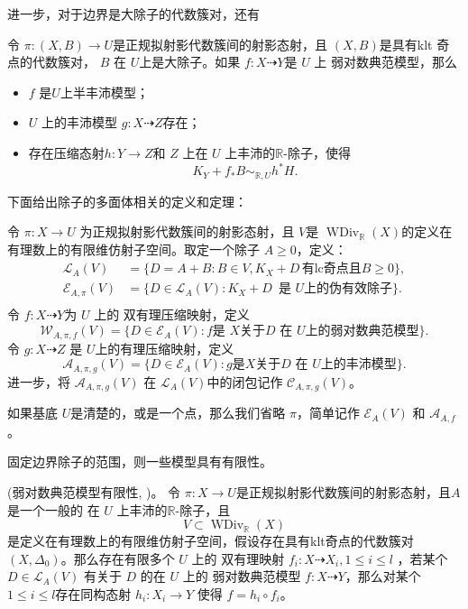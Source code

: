 进一步，对于边界是大除子的代数簇对，还有
\begin{lemma}\cite[Lemma 3.9.3]{BCHM10} 令 $ \pi:(X,B)\to U $是正规拟射影代数簇间的射影态射，且 $(X, B)$是具有klt 奇点的代数簇对，  $B$ 在 $U$上是大除子。如果 $f:X\dashrightarrow Y$是 $U$ 上 弱对数典范模型，那么
  \begin{itemize}
    \item $f$ 是$U$上半丰沛模型；
    \item  $U$ 上的丰沛模型  $g:X \dashrightarrow Z$存在；
    \item  存在压缩态射$h:Y\to Z$和 $Z$ 上在 $U$ 上丰沛的$\mathbb{R}$-除子，使得 
      \[ K_{Y}+f_*B\sim_{\mathbb{R},U} h^*H .\]
  \end{itemize}
\end{lemma}
下面给出除子的多面体相关的定义和定理：
\begin{definition}\label{polytopeofdivisor}
  \cite[Definition 1.1.4]{BCHM10} 令 $ \pi: X\to U $ 为正规拟射影代数簇间的射影态射，且 $ V $是 $ \operatorname{WDiv}_{\mathbb{R}}(X) $的定义在有理数上的有限维仿射子空间。取定一个除子 $ A\geqslant 0 $，定义：
  \[ \begin{aligned}
      \mathcal{L}_A(V)       & =\{D=A+B:B \in V,  K_X+D\, \text{有lc奇点且} B\geqslant0 \}, \\
    \mathcal{E}_{A,\pi}(V) & =\{D\in \mathcal{L}_A(V): K_X+D\, \text{ 是 } U \text{上的伪有效除子}\}.  \\
    \end{aligned} \]
  令 $ f:X \dashrightarrow Y$为 $U$ 上的 双有理压缩映射，定义
  \[ \mathcal{W}_{A,\pi,f}(V)=\{D\in \mathcal{E}_{A}(V): f \text{是   } X \text{关于}D \text{ 在 }U \text{上的弱对数典范模型}\} .\]
  令 $g:X\dashrightarrow Z  $ 是 $ U $上的有理压缩映射，定义
  \[ \mathcal{A}_{A,\pi,g}(V)=\{D\in \mathcal{E}_{A}(V): g \text{是} X \text{关于}D\text{ 在 }U \text{上的丰沛模型}\} .\]
  进一步，将 $ \mathcal{A}_{A,\pi,g}(V) $ 在 $\mathcal{L}_{A}(V)$中的闭包记作 $ \mathcal{C}_{A,\pi,g}(V) $。

  如果基底 $U$是清楚的，或是一个点，那么我们省略 $\pi$，简单记作 $\mathcal{E}_{A}(V)$ 和 $\mathcal{A}_{A,f}$。
\end{definition}
固定边界除子的范围，则一些模型具有有限性。
\begin{theorem}\label{finitewlcm}
  (弱对数典范模型有限性, \cite[Theorem E]{BCHM10})。
  令 $\pi: X\to U$是正规拟射影代数簇间的射影态射，且$A$是一个一般的 在 $U$ 上丰沛的$\mathbb{R}$-除子，且
    \[ V \subset \operatorname{WDiv}_{\mathbb{R}}(X) \]
  是定义在有理数上的有限维仿射子空间，假设存在具有klt奇点的代数簇对 $(X,\Delta_{0})$。那么存在有限多个 $U$ 上的 双有理映射 $f_{i}:X \dashrightarrow X_{i},1\leqslant i\leqslant l$ ，若某个 $D \in \mathcal{L}_{A}(V)$ 有关于 $D$ 的在 $U$ 上的  弱对数典范模型 $f:X \dashrightarrow  Y$，那么对某个$1\leqslant i\leqslant l$存在同构态射  $h_{i}:X_{i} \to Y$ 使得 $f=h_{i}\circ f_{i}$。
\end{theorem}
